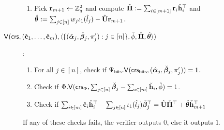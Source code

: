 \begin{description}
\begin{enumerate}
		\item Pick $\mathbf{r}_{m+1}\gets\mathbb{Z}_q^2$ and compute $\check{\mathbf{{\Pi}}} := \sum_{i\in[m+1]}\mathbf{r}_i\check{\mathbf{h}}_i^\top$ and $\hat{{\boldsymbol \theta}}:=\sum_{j\in[n]}w_j\iota_1(\hat{l}_j)-{\hat{\mathbf{{U}}}}\mathbf{r}_{m+1}$.
	\end{enumerate}
	\item[
	$\mathsf{V}(
	\mathsf{crs},
	({\hat{\mathbf{c}}}_1,\ldots,{\hat{\mathbf{c}}}_m),
	\langle
	\{
	(\hat{{\boldsymbol \alpha}}_j,\check{{\boldsymbol \beta}}_j,\pi'_j):j\in [n]
	\},
	\check{\phi},
	\check{\mathbf{{\Pi}}},\hat{{\boldsymbol \theta}}
	\rangle)$
	]:
	\hfill\\
	\begin{enumerate}
		\item For all $j\in[n]$, check if $\Psi_{\mathsf{bits}}.\mathsf{V}(\mathsf{crs}_{\mathsf{bits}}, (\hat{{\boldsymbol \alpha}}_j,\check{{\boldsymbol \beta}}_j,\pi'_j))=1$. 
		\item Check if $\Phi.\mathsf{V}(\mathsf{crs}_\Phi, \sum_{j\in[n]}\check{{\boldsymbol \beta}}_j-\sum_{i\in[m]}\check{\mathbf{h}}_i, \check{\phi})=1$.
		\item Check if $\sum_{i\in[m]}{\hat{\mathbf{c}}}_i\check{\mathbf{h}}_i^\top-\sum_{j\in[n]}\iota_1(\hat{l}_j)\check{{\boldsymbol \beta}}_j^\top = {\hat{\mathbf{{U}}}}\check{\mathbf{{\Pi}}}^\top+\hat{{\boldsymbol \theta}}\check{\mathbf{h}}_{m+1}^\top$
	\end{enumerate}
	If any of these checks fails, the verifier outputs $0$, else it outputs $1$.
	

\end{description}
